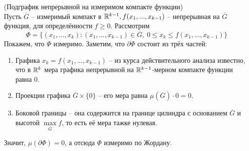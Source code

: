 \begin{example}(Подграфик непрерывной на измеримом компакте функции)\\
    Пусть $\overline{G}$ -- измеримый компакт в $\mathbb{R}^{k-1}, f(x_1,...,x_{k-1})$ -- непрерывная на $\overline{G}$ функция, для определённости $f \geqslant 0$. Рассмотрим 
    \[\Phi = \{(x_1,...,x_k) : (x_1,...,x_{k-1}) \in \overline{G},\ 0 \leqslant x_k \leqslant f(x_1,...,x_{k-1})\}\]
    Покажем, что $\Phi$ измеримо. Заметим, что $\partial\Phi$ состоит из трёх частей:
    \begin{enumerate}
        \item Графика $x_k = f(x_1,...,x_{k-1})$ -- из курса действительного анализа известно, что в $\mathbb{R}^k$ мера графика непрерывной на $\mathbb{R}^{k-1}$-мерном компакте функции равна 0.
        \item Проекции графика $\overline{G} \times \{0\}$ -- его мера равна $\mu(\overline{G}) \cdot 0 = 0$.
        \item Боковой границы -- она содержится на границе цилиндра с основанием $\overline{G}$ и высотой $\max\limits_{\overline{G}} f$, то есть её мера тажке нулевая.
    \end{enumerate}
    Значит, $\mu(\partial\Phi) = 0$, а отсюда $\Phi$ измеримо по Жордану.
\end{example}
\newpage